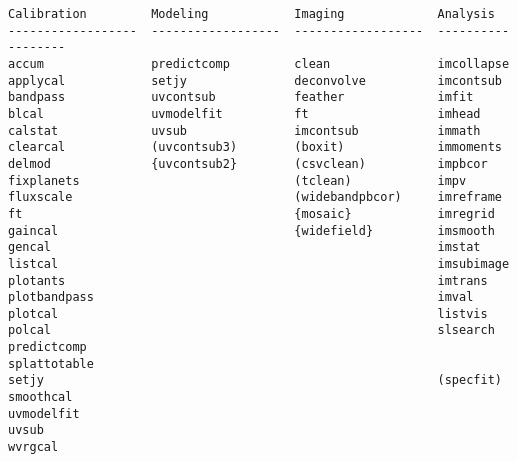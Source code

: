 \begin{verbatim}
Calibration         Modeling            Imaging             Analysis          
------------------  ------------------  ------------------  ------------------
accum               predictcomp         clean               imcollapse        
applycal            setjy               deconvolve          imcontsub         
bandpass            uvcontsub           feather             imfit             
blcal               uvmodelfit          ft                  imhead            
calstat             uvsub               imcontsub           immath            
clearcal            (uvcontsub3)        (boxit)             immoments         
delmod              {uvcontsub2}        (csvclean)          impbcor           
fixplanets                              (tclean)            impv              
fluxscale                               (widebandpbcor)     imreframe         
ft                                      {mosaic}            imregrid          
gaincal                                 {widefield}         imsmooth          
gencal                                                      imstat            
listcal                                                     imsubimage        
plotants                                                    imtrans           
plotbandpass                                                imval             
plotcal                                                     listvis           
polcal                                                      slsearch          
predictcomp                                                 splattotable      
setjy                                                       (specfit)         
smoothcal                                                                     
uvmodelfit                                                                    
uvsub                                                                         
wvrgcal                                                                       


\end{verbatim}
